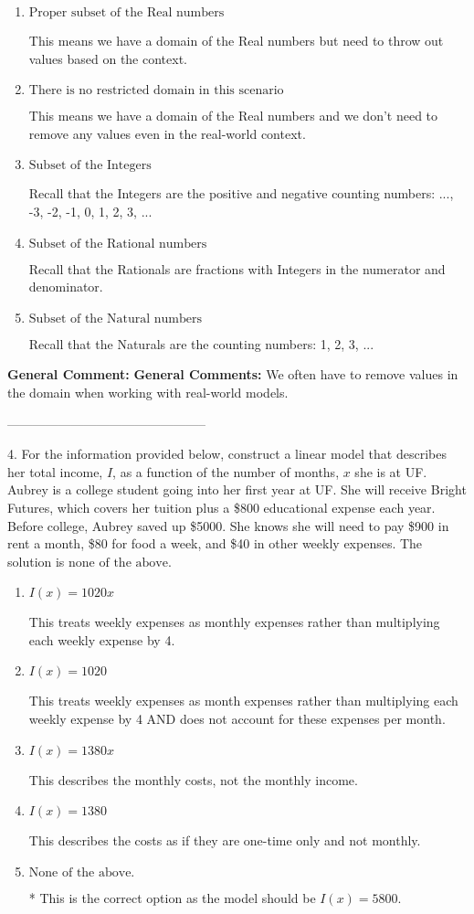 \documentclass{extbook}[14pt]
\begin{document}
\begin{enumerate}[label=\Alph*.] 
\item $ \text{Proper subset of the Real numbers} $ 

 This means we have a domain of the Real numbers but need to throw out values based on the context. 
\item $ \text{There is no restricted domain in this scenario} $ 

 This means we have a domain of the Real numbers and we don't need to remove any values even in the real-world context. 
\item $ \text{Subset of the Integers} $ 

 Recall that the Integers are the positive and negative counting numbers: ..., -3, -2, -1, 0, 1, 2, 3, ...  
\item $ \text{Subset of the Rational numbers} $ 

 Recall that the Rationals are fractions with Integers in the numerator and denominator. 
\item $ \text{Subset of the Natural numbers} $ 

 Recall that the Naturals are the counting numbers: 1, 2, 3, ... 
\end{enumerate} 
 
\textbf{General Comment:} \textbf{General Comments:} We often have to remove values in the domain when working with real-world models. 

-----------------------------------------------

4. For the information provided below, construct a linear model that describes her total income, $I$, as a function of the number of months, $x$ she is at UF.
Aubrey is a college student going into her first year at UF. She will receive Bright Futures, which covers her tuition plus a \$800 educational expense each year. Before college, Aubrey saved up \$5000. She knows she will need to pay \$900 in rent a month, \$80 for food a week, and \$40 in other weekly expenses. 
The solution is $ \text{none of the above.} $ 

\begin{enumerate}[label=\Alph*.] 
\item $ I(x) = 1020 x $ 

 This treats weekly expenses as monthly expenses rather than multiplying each weekly expense by 4. 
\item $ I(x) = 1020 $ 

 This treats weekly expenses as month expenses rather than multiplying each weekly expense by 4 AND does not account for these expenses per month. 
\item $ I(x) = 1380 x $ 

 This describes the monthly costs, not the monthly income. 
\item $ I(x) = 1380 $ 

 This describes the costs as if they are one-time only and not monthly. 
\item $ \text{None of the above.} $ 

 * This is the correct option as the model should be $I(x) = 5800$. 
\end{enumerate} 
 
\end{document}
